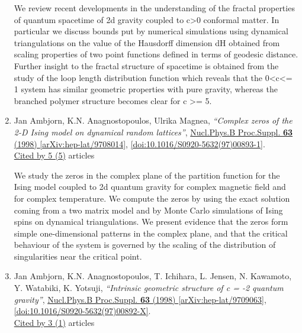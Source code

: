 \documentclass[a4paper,10pt]{article}
\begin{document}
\begin{enumerate}
We review recent developments in the understanding of the fractal properties of quantum spacetime of 2d gravity coupled to c>0 conformal matter. In particular we discuss bounds put by numerical simulations using dynamical triangulations on the value of the Hausdorff dimension dH obtained from scaling properties of two point functions defined in terms of geodesic distance. Further insight to the fractal structure of spacetime is obtained from the study of the loop length distribution function which reveals that the 0<c<= 1 system has similar geometric properties with pure gravity, whereas the branched polymer structure becomes clear for c >= 5.
\item Jan Ambjorn, K.N. Anagnostopoulos, Ulrika Magnea, {\it ``Complex zeros of the 2-D Ising model on dynamical random lattices''}, \href{https://www.doi.org/10.1016/S0920-5632(97)00893-1}{Nucl.Phys.B Proc.Suppl. {\bf 63} (1998) } \href{https://arxiv.org/abs/hep-lat/9708014}{[arXiv:hep-lat/9708014]}, \href{https://www.doi.org/10.1016/S0920-5632(97)00893-1}{[doi:10.1016/S0920-5632(97)00893-1]}.
\\\href{https://inspirehep.net/literature/?q=refersto%3Arecid%3A447442}{Cited by 5 (5)} articles

We study the zeros in the complex plane of the partition function for the Ising model coupled to 2d quantum gravity for complex magnetic field and for complex temperature. We compute the zeros by using the exact solution coming from a two matrix model and by Monte Carlo simulations of Ising spins on dynamical triangulations. We present evidence that the zeros form simple one-dimensional patterns in the complex plane, and that the critical behaviour of the system is governed by the scaling of the distribution of singularities near the critical point.
\item Jan Ambjorn, K.N. Anagnostopoulos, T. Ichihara, L. Jensen, N. Kawamoto, Y. Watabiki, K. Yotsuji, {\it ``Intrinsic geometric structure of c = -2 quantum gravity''}, \href{https://www.doi.org/10.1016/S0920-5632(97)00892-X}{Nucl.Phys.B Proc.Suppl. {\bf 63} (1998) } \href{https://arxiv.org/abs/hep-lat/9709063}{[arXiv:hep-lat/9709063]}, \href{https://www.doi.org/10.1016/S0920-5632(97)00892-X}{[doi:10.1016/S0920-5632(97)00892-X]}.
\\\href{https://inspirehep.net/literature/?q=refersto%3Arecid%3A448560}{Cited by 3 (1)} articles


\end{enumerate}
\end{document}
